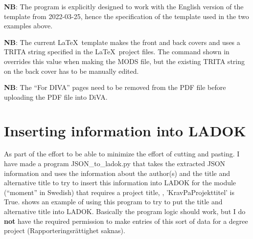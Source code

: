 \textbf{NB}: The program is explicitly designed to work with the English version of the template from 2022-03-25, hence the specification of the template used in the two examples above.


\textbf{NB}: The current \LaTeX~template makes the front and back covers and uses a TRITA string specified in the \LaTeX~project files. The command shown in  overrides this value when making the MODS file, but the existing TRITA string on the back cover has to be manually edited.


\textbf{NB}: The ``For DIVA'' pages need to be removed from the PDF file before uploading the PDF file into DiVA.

\section[Inserting information into LADOK]{Inserting information into LADOK}
\label{sec:JSONtoLADOKDiVAAdmis}
As part of the effort to be able to minimize the effort of cutting and pasting. I have made a program JSON\_to\_ladok.py that takes the extracted JSON information and uses the information about the author(s) and the title and alternative title to try to insert this information into LADOK for the module (\ie ``moment'' in Swedish) that requires a project title, \ie, 'KravPaProjekttitel' is True.  shows an example of using this program to try to put the title and alternative title into LADOK. Basically the program logic should work, but I do \textbf{not} have the required permission to make entries of this sort of data for a degree project (\ie Rapporteringsrättighet saknas).

